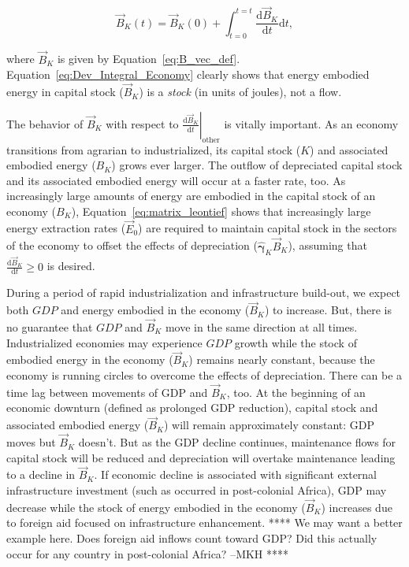 \begin{equation} \label{eq:Dev_Integral_Economy}
	\vec{B}_{K}(t) 
	= \vec{B}_{K}(0) 
	+ \int_{t=0}^{t=t} \frac{\mathrm{d}\vec{B}_{K}}{\mathrm{d}t}\mathrm{d}t,
\end{equation}

\noindent{}where $\vec{B}_{K}$ is given by Equation~\ref{eq:B_vec_def}.
Equation~\ref{eq:Dev_Integral_Economy} clearly shows
that energy embodied energy in capital stock ($\vec{B}_{K}$) 
is a \emph{stock} (in units of joules), not a flow.

The behavior of $\vec{B}_{K}$ with respect to
$\left. \frac{\mathrm{d}\vec{B}_{K}}{\mathrm{d}t} \right|_{\mathrm{other}}$ 
is vitally important. 
As an economy transitions from agrarian to industrialized, 
its capital stock ($K$) and associated embodied energy ($B_{K}$)
grows ever larger. 
The outflow of depreciated capital stock and its associated embodied energy 
will occur at a faster rate, too.
As increasingly large amounts of energy are embodied 
in the capital stock of an economy ($B_{K}$), 
Equation~\ref{eq:matrix_leontief} shows that
increasingly large energy extraction rates ($\vec{E}_{0}$) 
are required to maintain capital stock 
in the sectors of the economy
to offset the effects of depreciation 
($\hat{\boldsymbol{\gamma}}_{K} \vec{B}_{K}$),
assuming that $\frac{\mathrm{d}\vec{B}_{K}}{\mathrm{d}t} \ge 0$ 
is desired. 

During a period of rapid industrialization and infrastructure build-out, 
we expect both $GDP$ and energy embodied in the economy ($\vec{B}_{K}$)
to increase.
But, there is no guarantee that $GDP$ and $\vec{B}_{K}$ move 
in the same direction at all times.
Industrialized economies may experience $GDP$ growth while 
the stock of embodied energy in the economy ($\vec{B}_{K}$) remains nearly constant,
because the economy is running circles to overcome the effects of depreciation.
There can be a time lag between movements of GDP and $\vec{B}_{K}$, too.
At the beginning of an economic downturn (defined as prolonged GDP reduction),
capital stock and associated embodied energy ($\vec{B}_{K}$) will remain approximately constant:
GDP moves but $\vec{B}_{K}$ doesn't.
But as the GDP decline continues, 
maintenance flows for capital stock will be reduced
and depreciation will overtake maintenance leading to a decline in $\vec{B}_{K}$. 
If economic decline is associated with significant external 
infrastructure investment (such as occurred in post-colonial Africa),
GDP may decrease 
while the stock of energy embodied in the economy ($\vec{B}_{K}$) increases 
due to foreign aid focused on infrastructure enhancement.
**** We may want a better example here.
Does foreign aid inflows count toward GDP\@?
Did this actually occur for any country in post-colonial Africa? 
--MKH ****

